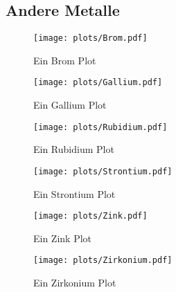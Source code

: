 \subsection{Andere Metalle}
\begin{figure}
    \centering
    \texttt{[image: plots/Brom.pdf]}
    \caption{Ein Brom Plot}
    \label{fig:Brom}
\end{figure}
\begin{figure}
    \centering
    \texttt{[image: plots/Gallium.pdf]}
    \caption{Ein Gallium Plot}
    \label{fig:Gallium}
\end{figure}
\begin{figure}
    \centering
    \texttt{[image: plots/Rubidium.pdf]}
    \caption{Ein Rubidium Plot}
    \label{fig:Rubidium}
\end{figure}
\begin{figure}
    \centering
    \texttt{[image: plots/Strontium.pdf]}
    \caption{Ein Strontium Plot}
    \label{fig:Strontium}
\end{figure}
\begin{figure}
    \centering
    \texttt{[image: plots/Zink.pdf]}
    \caption{Ein Zink Plot}
    \label{fig:Zink}
\end{figure}
\begin{figure}
    \centering
    \texttt{[image: plots/Zirkonium.pdf]}
    \caption{Ein Zirkonium Plot}
    \label{fig:Zirkonium}
\end{figure}